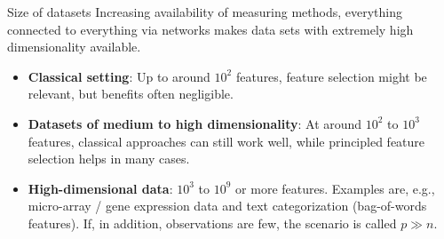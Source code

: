 \documentclass[11pt,compress,t,notes=noshow, xcolor=table]{beamer}
\begin{document}
  \begin{vbframe}{Size of datasets}
Increasing availability of measuring methods, everything connected to everything via networks makes data sets with extremely high dimensionality available.

\vspace{0.5cm}
    \begin{itemize}
    \setlength{\itemsep}{1.2em}
      \item \textbf{Classical setting}: Up to around $10^2$ features, feature selection might be relevant, but benefits often negligible.
      \item \textbf{Datasets of medium to high dimensionality}:
        At around $10^2$ to $10^3$ features, classical approaches can still work well, while principled feature selection helps in many cases.
      \item \textbf{High-dimensional data}: $10^3$ to $10^9$ or more features.
        Examples are, e.g., micro-array / gene expression data and text categorization (bag-of-words features).
        If, in addition, observations are few, the scenario is called $p \gg n$.
    \end{itemize}

  \end{vbframe}
\end{document}
